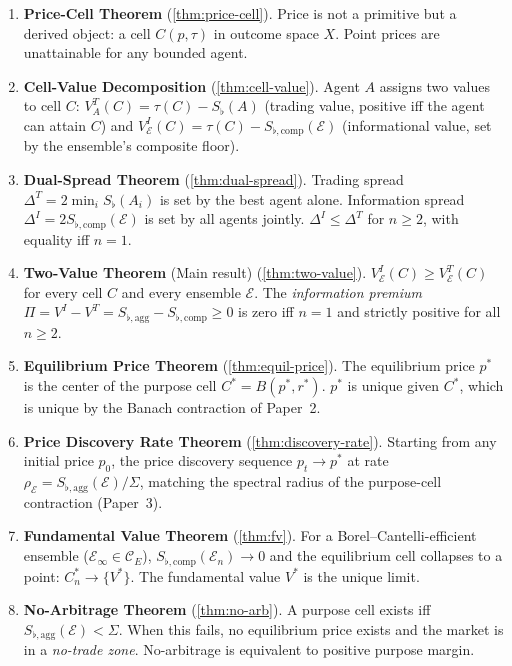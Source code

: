 \documentclass[twocolumn,11pt,a4paper]{article}
\theoremstyle{remark}
\newcommand{\Sflat}{S_{\flat}}
\newcommand{\tol}{\tau}
\newcommand{\Ens}{\mathcal{E}}
\newcommand{\MidP}{p^*}                  %
\newcommand{\SpreadT}{\Delta^T}          %
\newcommand{\SpreadI}{\Delta^I}          %
\newcommand{\ValT}{V^T}                  %
\newcommand{\ValI}{V^I}                  %
\newcommand{\FV}{V^*}                    %
\newcommand{\SflatT}{S_{\flat,\mathrm{agg}}}        %
\newcommand{\SflatI}{S_{\flat,\mathrm{comp}}}       %
\newcommand{\Prem}{\Pi}                  %
\newcommand{\srad}{\rho}               %
\begin{document}
\begin{enumerate}[leftmargin=*, label=\textbf{(\roman*)}]
\item \textbf{Price-Cell Theorem}
  (\cref{thm:price-cell}).
  Price is not a primitive but a derived object: a cell $C(p,\tol)$ in
  outcome space $X$.  Point prices are unattainable for any bounded agent.

\item \textbf{Cell-Value Decomposition}
  (\cref{thm:cell-value}).
  Agent $A$ assigns two values to cell $C$:
  $\ValT_A(C) = \tol(C) - \Sflat(A)$ (trading value, positive iff the
  agent can attain $C$) and $\ValI_\Ens(C) = \tol(C) - \SflatI(\Ens)$
  (informational value, set by the ensemble's composite floor).

\item \textbf{Dual-Spread Theorem}
  (\cref{thm:dual-spread}).
  Trading spread $\SpreadT = 2\min_i\Sflat(A_i)$ is set by the best agent
  alone.  Information spread $\SpreadI = 2\SflatI(\Ens)$ is set by all
  agents jointly.  $\SpreadI \le \SpreadT$ for $n \ge 2$, with equality
  iff $n=1$.

\item \textbf{Two-Value Theorem} (Main result)
  (\cref{thm:two-value}).
  $\ValI_\Ens(C) \ge \ValT_\Ens(C)$ for every cell $C$ and every ensemble
  $\Ens$.  The \emph{information premium} $\Prem = \ValI - \ValT =
  \SflatT - \SflatI \ge 0$ is zero iff $n=1$ and strictly positive for
  all $n\ge 2$.

\item \textbf{Equilibrium Price Theorem}
  (\cref{thm:equil-price}).
  The equilibrium price $\MidP$ is the center of the purpose cell $C^* =
  B(\MidP, r^*)$.  $\MidP$ is unique given $C^*$, which is unique by the
  Banach contraction of Paper~2.

\item \textbf{Price Discovery Rate Theorem}
  (\cref{thm:discovery-rate}).
  Starting from any initial price $p_0$, the price discovery sequence
  $p_t \to \MidP$ at rate $\srad_\Ens = \SflatT(\Ens)/\Sigma$, matching
  the spectral radius of the purpose-cell contraction (Paper~3).

\item \textbf{Fundamental Value Theorem}
  (\cref{thm:fv}).
  For a Borel--Cantelli-efficient ensemble ($\Ens_\infty \in \mathcal{C}_E$),
  $\SflatI(\Ens_n) \to 0$ and the equilibrium cell collapses to a point:
  $C^*_n \to \{\FV\}$.  The fundamental value $\FV$ is the unique limit.

\item \textbf{No-Arbitrage Theorem}
  (\cref{thm:no-arb}).
  A purpose cell exists iff $\SflatT(\Ens) < \Sigma$.  When this fails,
  no equilibrium price exists and the market is in a \emph{no-trade zone}.
  No-arbitrage is equivalent to positive purpose margin.


\end{enumerate}
\end{document}
